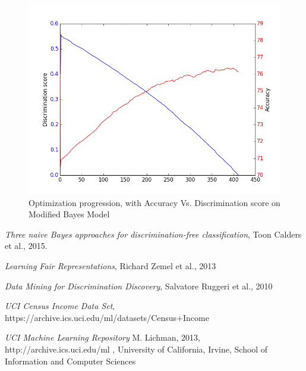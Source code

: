\documentclass[paper=a4, fontsize=11pt]{scrartcl} %
\numberwithin{equation}{section} %
\numberwithin{figure}{section} %
\numberwithin{table}{section} %
\begin{document}
\begin{figure}[H]
  \centering
  \includegraphics[scale=0.5]{images/modified_optimization.png}
  \caption[optimization]
   {Optimization progression, with Accuracy Vs. Discrimination score on Modified Bayes Model}
\end{figure}



\begin{thebibliography}{9} 

 \emph{Three naive Bayes approaches for discrimination-free
classification}, Toon Calders et al., 2015.

 \emph{Learning Fair Representations}, Richard Zemel et al., 2013

 \emph{Data Mining for Discrimination Discovery}, Salvatore Ruggeri et al., 2010 

 \emph{UCI Census Income Data Set}, https://archive.ics.uci.edu/ml/datasets/Census+Income

 \emph{{UCI} Machine Learning Repository}
M. Lichman, 2013, http://archive.ics.uci.edu/ml , University of California, Irvine, School of Information and Computer Sciences


\end{thebibliography}
\end{document}
